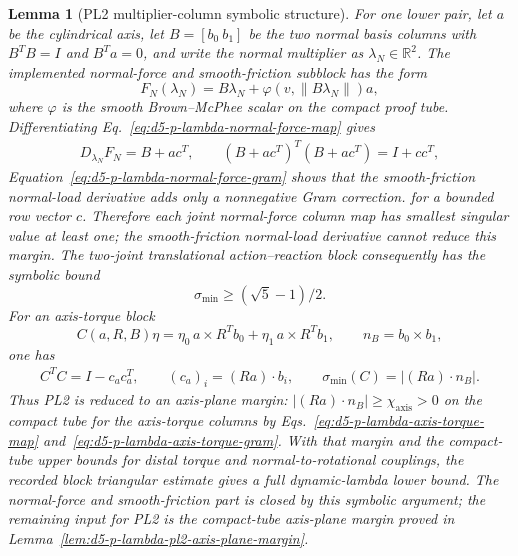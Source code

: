 \documentclass[preprint,12pt]{elsarticle}
\newtheorem{lemma}{Lemma}
\begin{document}
\begin{lemma}[PL2 multiplier-column symbolic structure]
\label{lem:d5-p-lambda-pl2-symbolic-structure}
For one lower pair, let \(a\) be the cylindrical axis, let
\(B=[b_0\ b_1]\) be the two normal basis columns with \(B^T B=I\) and
\(B^T a=0\), and write the normal multiplier as
\(\lambda_N\in\mathbb R^2\).  The implemented normal-force and
smooth-friction subblock has the form
\begin{equation}
\label{eq:d5-p-lambda-normal-force-map}
  F_N(\lambda_N)=B\lambda_N+\varphi(v,\|B\lambda_N\|)a ,
\end{equation}
where \(\varphi\) is the smooth Brown--McPhee scalar on the compact proof
tube.  Differentiating Eq.~\eqref{eq:d5-p-lambda-normal-force-map} gives
\begin{equation}
\label{eq:d5-p-lambda-normal-force-gram}
\begin{aligned}
  D_{\lambda_N}F_N=B+a c^T,\qquad
  (B+a c^T)^T(B+a c^T)=I+c c^T,
\end{aligned}
\end{equation}
Equation~\eqref{eq:d5-p-lambda-normal-force-gram} shows that the
smooth-friction normal-load derivative adds only a nonnegative Gram
correction.
for a bounded row vector \(c\).  Therefore each joint normal-force column
map has smallest singular value at least one; the smooth-friction
normal-load derivative cannot reduce this margin.  The two-joint
translational action--reaction block consequently has the symbolic bound
\begin{equation}
\label{eq:d5-p-lambda-trans-symbolic-bound}
  \sigma_{\min}\ge {(\sqrt5-1)}/{2}.
\end{equation}
For an axis-torque block
\begin{equation}
\label{eq:d5-p-lambda-axis-torque-map}
  C(a,R,B)\eta=\eta_0\,a\times R^T b_0+\eta_1\,a\times R^T b_1,
  \qquad n_B=b_0\times b_1 ,
\end{equation}
one has
\begin{equation}
\label{eq:d5-p-lambda-axis-torque-gram}
\begin{aligned}
  C^T C=I-c_a c_a^T,\qquad (c_a)_i=(Ra)\cdot b_i,\qquad
  \sigma_{\min}(C)=|(Ra)\cdot n_B|.
\end{aligned}
\end{equation}
Thus PL2 is reduced to an axis-plane margin:
\(|(Ra)\cdot n_B|\ge\chi_{\mathrm{axis}}>0\) on the compact tube for the
axis-torque columns by Eqs.~\eqref{eq:d5-p-lambda-axis-torque-map}
and~\eqref{eq:d5-p-lambda-axis-torque-gram}.  With that margin and the compact-tube upper bounds for
distal torque and normal-to-rotational couplings, the recorded block
triangular estimate gives a full dynamic-lambda lower bound.  The
normal-force and smooth-friction part is closed by this symbolic argument;
the remaining input for PL2 is the compact-tube axis-plane margin proved in
Lemma~\ref{lem:d5-p-lambda-pl2-axis-plane-margin}.
\end{lemma}
\end{document}
